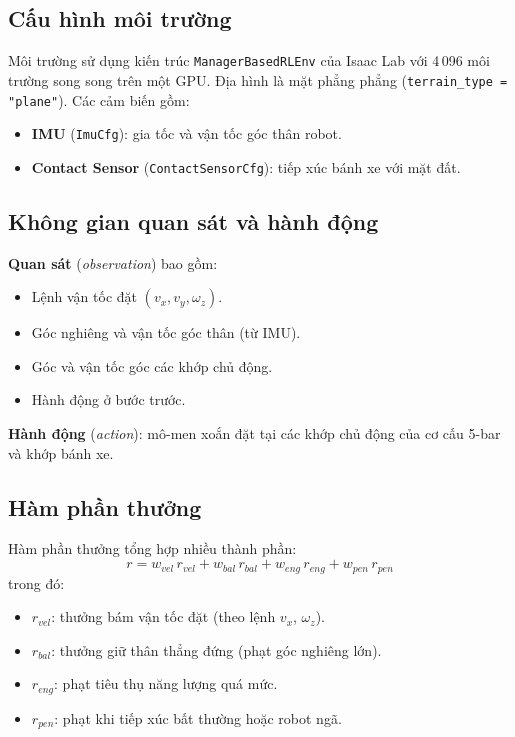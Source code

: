 \subsection{Cấu hình môi trường}

Môi trường sử dụng kiến trúc \texttt{ManagerBasedRLEnv} của Isaac Lab với
4\,096 môi trường song song trên một GPU. Địa hình là mặt phẳng phẳng
(\texttt{terrain\_type = "plane"}). Các cảm biến gồm:
\begin{itemize}
    \item \textbf{IMU} (\texttt{ImuCfg}): gia tốc và vận tốc góc thân robot.
    \item \textbf{Contact Sensor} (\texttt{ContactSensorCfg}): tiếp xúc bánh
    xe với mặt đất.
\end{itemize}

\subsection{Không gian quan sát và hành động}

\textbf{Quan sát} (\textit{observation}) bao gồm:
\begin{itemize}
    \item Lệnh vận tốc đặt $(v_x, v_y, \omega_z)$.
    \item Góc nghiêng và vận tốc góc thân (từ IMU).
    \item Góc và vận tốc góc các khớp chủ động.
    \item Hành động ở bước trước.
\end{itemize}

\textbf{Hành động} (\textit{action}): mô-men xoắn đặt tại các khớp chủ động
của cơ cấu 5-bar và khớp bánh xe.

\subsection{Hàm phần thưởng}

Hàm phần thưởng tổng hợp nhiều thành phần:
\begin{equation}
    r = w_{vel}\,r_{vel} + w_{bal}\,r_{bal}
      + w_{eng}\,r_{eng} + w_{pen}\,r_{pen}
    \label{eq:reward_total}
\end{equation}
trong đó:
\begin{itemize}
    \item $r_{vel}$: thưởng bám vận tốc đặt (theo lệnh $v_x$, $\omega_z$).
    \item $r_{bal}$: thưởng giữ thân thẳng đứng (phạt góc nghiêng lớn).
    \item $r_{eng}$: phạt tiêu thụ năng lượng quá mức.
    \item $r_{pen}$: phạt khi tiếp xúc bất thường hoặc robot ngã.
\end{itemize}

